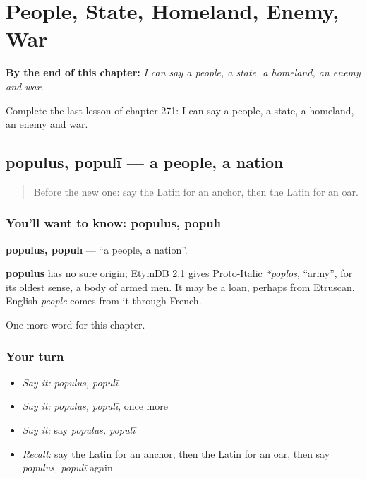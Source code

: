 
\chapter{People, State, Homeland, Enemy, War}
\label{ch:la-people-state-homeland-enemy-war}

\begin{chapteropening}
\textbf{By the end of this chapter:} \emph{I can say a people, a state, a homeland, an enemy and war.}

Complete the last lesson of chapter 271: I can say a people, a state, a homeland, an enemy and war.
\end{chapteropening}

\section[populus, populī]{populus, populī — a people, a nation}

\label{lesson:LA-C271-populus}



\begin{quote}
Before the new one: say the Latin for an anchor, then the Latin for an oar.
\end{quote}

\subsection*{You'll want to know: populus, populī}
\textbf{populus, populī} — \textquotedblleft{}a people, a nation\textquotedblright{}.

\begin{cousinweb}
\textbf{populus} has no sure origin; EtymDB 2.1 gives Proto-Italic \emph{*poplos}, \textquotedblleft{}army\textquotedblright{}, for its oldest sense, a body of armed men. It may be a loan, perhaps from Etruscan. English \emph{people} comes from it through French.
\end{cousinweb}

\begin{grammarlens}[title={What you've built}]
One more word for this chapter.
\end{grammarlens}

\subsection*{Your turn}
\begin{itemize}
\raggedright
  \item \emph{Say it:} \emph{populus, populī}
  \item \emph{Say it:} \emph{populus, populī}, once more
  \item \emph{Say it:} say \emph{populus, populī}
  \item \emph{Recall:} say the Latin for an anchor, then the Latin for an oar, then say \emph{populus, populī} again
\end{itemize}

